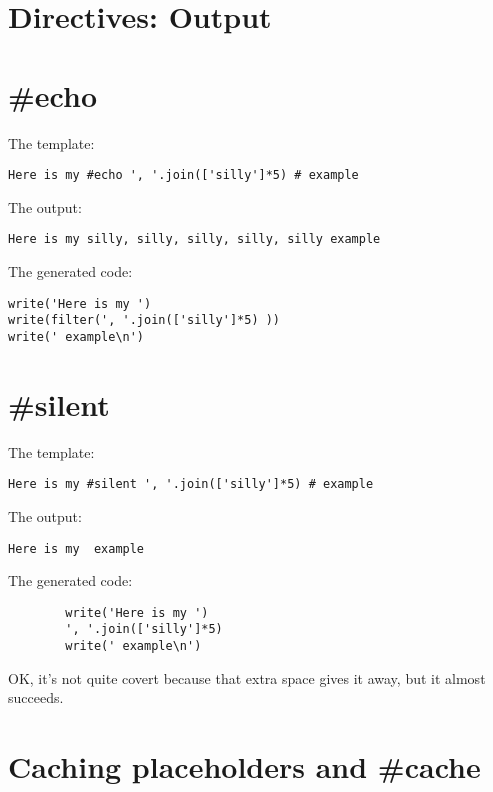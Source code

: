 \section{Directives: Output}
\label{output}

\section{\#echo}
\label{output.echo}

The template:
\begin{verbatim}
Here is my #echo ', '.join(['silly']*5) # example
\end{verbatim}

The output:
\begin{verbatim}
Here is my silly, silly, silly, silly, silly example
\end{verbatim}

The generated code:
\begin{verbatim}
write('Here is my ')
write(filter(', '.join(['silly']*5) ))
write(' example\n')
\end{verbatim}

\section{\#silent}
\label{output.silent}

The template:
\begin{verbatim}
Here is my #silent ', '.join(['silly']*5) # example
\end{verbatim}

The output:
\begin{verbatim}
Here is my  example
\end{verbatim}

The generated code:
\begin{verbatim}
        write('Here is my ')
        ', '.join(['silly']*5) 
        write(' example\n')
\end{verbatim}

OK, it's not quite covert because that extra space gives it away, but it 
almost succeeds.

\section{Caching placeholders and \#cache}
\label{output.cache}

